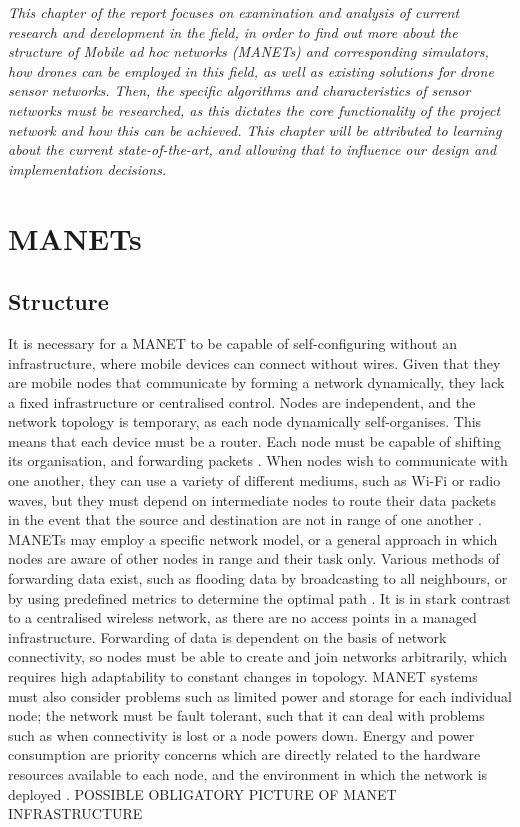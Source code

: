 \emph{This chapter of the report focuses on examination and analysis of current research and development in the field, in order to find out more about the structure of Mobile ad hoc networks (MANETs) and corresponding simulators, how drones can be employed in this field, as well as existing solutions for drone sensor networks. Then, the specific algorithms and characteristics of sensor networks must be researched, as this dictates the core functionality of the project network and how this can be achieved. This chapter will be attributed to learning about the current state-of-the-art, and allowing that to influence our design and implementation decisions.}

\section{MANETs}

\subsection{Structure}
It is necessary for a MANET to be capable of self-configuring without an infrastructure, where mobile devices can connect without wires. Given that they are mobile nodes that communicate by forming a network dynamically, they lack a fixed infrastructure or centralised control. Nodes are independent, and the network topology is temporary, as each node dynamically self-organises. This means that each device must be a router. Each node must be capable of shifting its organisation, and forwarding packets \cite{jaydipsen2010}. When nodes wish to communicate with one another, they can use a variety of different mediums, such as Wi-Fi or radio waves, but they must depend on intermediate nodes to route their data packets in the event that the source and destination are not in range of one another \cite{ramramathanjasonredi2012}.
MANETs may employ a specific network model, or a general approach in which nodes are aware of other nodes in range and their task only. Various methods of forwarding data exist, such as flooding data by broadcasting to all neighbours, or by using predefined metrics to determine the optimal path \cite{jaydipsen2010}. It is in stark contrast to a centralised wireless network, as there are no access points in a managed infrastructure. Forwarding of data is dependent on the basis of network connectivity, so nodes must be able to create and join networks arbitrarily, which requires high adaptability to constant changes in topology. MANET systems must also consider problems such as limited power and storage for each individual node; the network must be fault tolerant, such that it can deal with problems such as when connectivity is lost or a node powers down. Energy and power consumption are priority concerns which are directly related to the hardware resources available to each node, and the environment in which the network is deployed \cite{sajshahmina2012}.
POSSIBLE OBLIGATORY PICTURE OF MANET INFRASTRUCTURE

